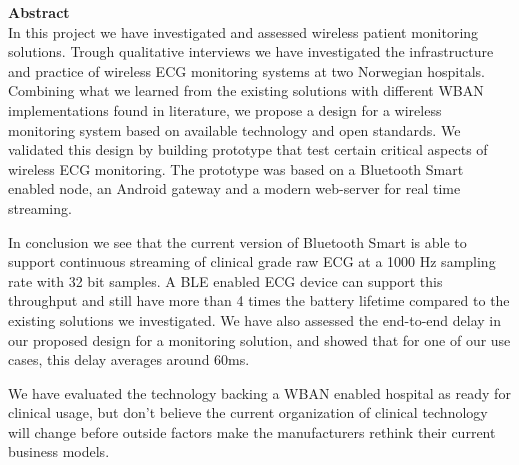 \noindent \textbf{Abstract}
\\
\newline	
\noindent
In this project we have investigated and assessed wireless patient monitoring solutions. Trough qualitative interviews we have investigated the infrastructure and practice of wireless ECG monitoring systems at two Norwegian hospitals. Combining what we learned from the existing solutions with different WBAN implementations found in literature, we propose a design for a wireless monitoring system based on available technology and open standards. We validated this design by building prototype that test certain critical aspects of wireless ECG monitoring. The prototype was based on a Bluetooth Smart enabled node, an Android gateway and a modern web-server for real time streaming.

In conclusion we see that the current version of Bluetooth Smart is able to support continuous streaming of clinical grade raw ECG at a 1000 Hz sampling rate with 32 bit samples. A BLE enabled ECG device can support this throughput and still have more than 4 times the battery lifetime compared to the existing solutions we investigated. We have also assessed the end-to-end delay in our proposed design for a monitoring solution, and showed that for one of our use cases, this delay averages around 60ms.

We have evaluated the technology backing a WBAN enabled hospital as ready for clinical usage, but don't believe the current organization of clinical technology will change before outside factors make the manufacturers rethink their current business models. 